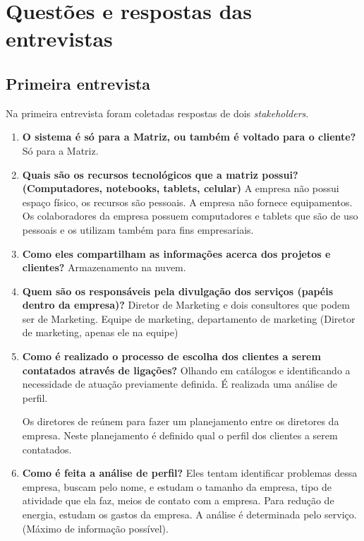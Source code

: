\chapter{Questões e respostas das entrevistas}
\label{questionario}

\section{Primeira entrevista}
Na primeira entrevista foram coletadas respostas de dois \textit{stakeholders}.

\begin{enumerate}
	\item \textbf{O sistema é só para a Matriz, ou também é voltado para o cliente?}
		\subitem Só para a Matriz.

	\item \textbf{Quais são os recursos tecnológicos que a matriz possui? (Computadores, notebooks, tablets, celular)}
		\subitem A empresa não possui espaço físico, os recursos são pessoais. A empresa não fornece equipamentos.
		\subitem Os colaboradores da empresa possuem computadores e tablets que são de uso pessoais e os utilizam também para fins empresariais.
	\item \textbf{Como eles compartilham as informações acerca dos projetos e clientes?}
	      \subitem Armazenamento na nuvem.
	\item \textbf{Quem são os responsáveis pela divulgação dos serviços (papéis dentro da empresa)?}
		\subitem Diretor de Marketing e dois consultores que podem ser de Marketing.
		\subitem Equipe de marketing, departamento de marketing (Diretor de marketing, apenas ele na equipe)
	\item \textbf{Como é realizado o processo de escolha dos clientes a serem contatados através de ligações?}
		\subitem Olhando em catálogos e identificando a necessidade de atuação previamente definida. É realizada uma análise de perfil.
			
		\subitem Os diretores de reúnem para fazer um planejamento entre os diretores da empresa. Neste planejamento é definido qual o perfil dos clientes a serem contatados.

	\item \textbf{Como é feita a análise de perfil?}
		\subitem Eles tentam identificar problemas dessa empresa, buscam pelo nome, e estudam o tamanho da empresa, tipo de atividade que ela faz, meios de contato com a empresa. 
	Para redução de energia, estudam os gastos da empresa.
	A análise é determinada pelo serviço.
	(Máximo de informação possível).


\end{enumerate}
